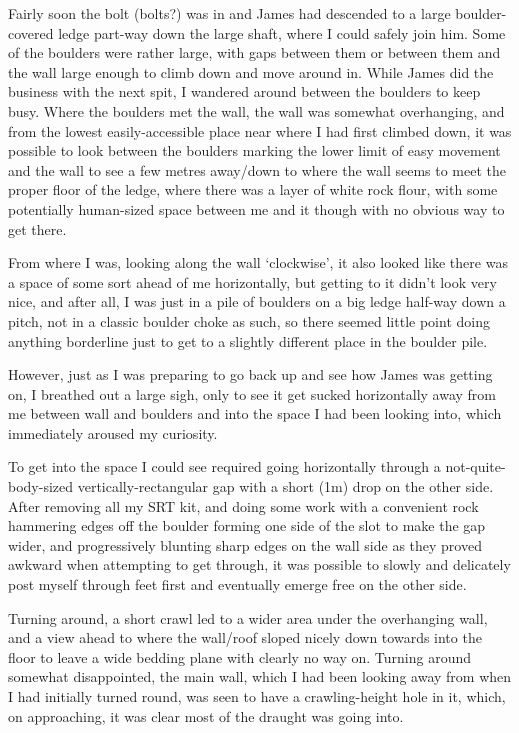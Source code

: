 Fairly soon the bolt (bolts?) was in and James had descended to a large
boulder-covered ledge part-way down the large shaft, where I could
safely join him. Some of the boulders were rather large, with gaps
between them or between them and the wall large enough to climb down and
move around in. While James did the business with the next spit, I
wandered around between the boulders to keep busy. Where the boulders
met the wall, the wall was somewhat overhanging, and from the lowest
easily-accessible place near where I had first climbed down, it was
possible to look between the boulders marking the lower limit of easy
movement and the wall to see a few metres away/down to where the wall
seems to meet the proper floor of the ledge, where there was a layer of
white rock flour, with some potentially human-sized space between me and
it though with no obvious way to get there.

From where I was, looking along the wall `clockwise', it also looked
like there was a space of some sort ahead of me horizontally, but
getting to it didn't look very nice, and after all, I was just in a pile
of boulders on a big ledge half-way down a pitch, not in a classic
boulder choke as such, so there seemed little point doing anything
borderline just to get to a slightly different place in the boulder
pile.

However, just as I was preparing to go back up and see how James was
getting on, I breathed out a large sigh, only to see it get sucked
horizontally away from me between wall and boulders and into the space I
had been looking into, which immediately aroused my curiosity.

To get into the space I could see required going horizontally through a
not-quite-body-sized vertically-rectangular gap with a short (1m) drop
on the other side. After removing all my SRT kit, and doing some work
with a convenient rock hammering edges off the boulder forming one side
of the slot to make the gap wider, and progressively blunting sharp
edges on the wall side as they proved awkward when attempting to get
through, it was possible to slowly and delicately post myself through
feet first and eventually emerge free on the other side.

Turning around, a short crawl led to a wider area under the overhanging
wall, and a view ahead to where the wall/roof sloped nicely down towards
into the floor to leave a wide bedding plane with clearly no way on.
Turning around somewhat disappointed, the main wall, which I had been
looking away from when I had initially turned round, was seen to have a
crawling-height hole in it, which, on approaching, it was clear most of
the draught was going into.

